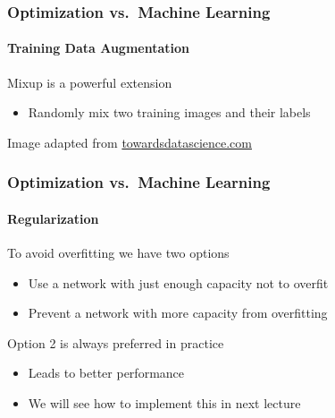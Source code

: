 \documentclass[xetex,professionalfont]{beamer}
\renewcommand\emph[1]{\textcolor{tuwcvl_cvl_blue}{#1}}
\begin{document}
  
  \begin{frame}
    \frametitle{Optimization vs.~Machine Learning}
    \framesubtitle{Training Data Augmentation}
  
  \emph{Mixup} is a powerful extension
  \begin{itemize}
      \item Randomly mix two training images and their labels
  \end{itemize}
  
  \smallskip
  
  \begin{center}
      {\centering Image adapted from \href{https://towardsdatascience.com/enhancing-neural-networks-with-mixup-in-pytorch-5129d261bc4a}{towardsdatascience.com}}
  \end{center}
  
  \end{frame}

  
  \begin{frame}
    \frametitle{Optimization vs.~Machine Learning}
    \framesubtitle{Regularization}
  
    To avoid overfitting we have two options
    \begin{itemize}
      \item Use a network with just enough capacity not to overfit
      \item Prevent a network with more capacity from overfitting
  \end{itemize}

  \bigskip

  Option 2 is always preferred in practice
  \begin{itemize}
    \item Leads to better performance
    \item We will see how to implement this in next lecture
\end{itemize}

  \end{frame}
\end{document}
